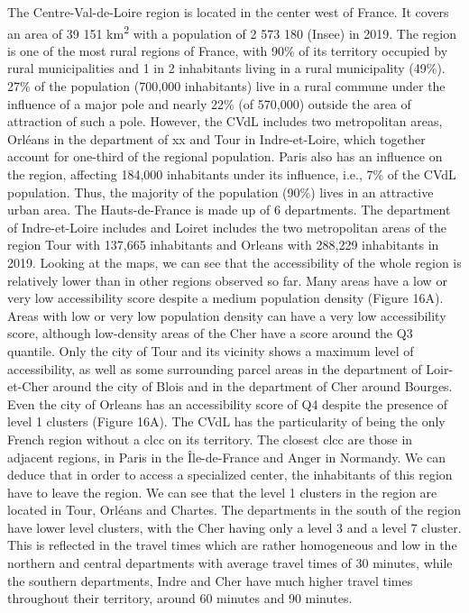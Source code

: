 The Centre-Val-de-Loire region is located in the center west of France. It
covers an area of 39 151 km\textsuperscript{2} with a population of 2 573 180
(Insee) in 2019. The region is one of the most rural regions of France, with
90\% of its territory occupied by rural municipalities and 1 in 2 inhabitants
living in a rural municipality (49\%). 27\% of the population (700,000
inhabitants) live in a rural commune under the influence of a major pole and
nearly 22\% (of 570,000) outside the area of attraction of such a pole. However,
the CVdL includes two metropolitan areas, Orléans in the department of xx and
Tour in Indre-et-Loire, which together account for one-third of the regional
population. Paris also has an influence on the region, affecting 184,000
inhabitants under its influence, i.e., 7\% of the CVdL population. Thus, the
majority of the population (90\%) lives in an attractive urban area. The
Hauts-de-France is made up of 6 departments. The department of Indre-et-Loire
includes and Loiret includes the two metropolitan areas of the region Tour with
137,665 inhabitants and Orleans with 288,229 inhabitants in 2019. Looking at the
maps, we can see that the accessibility of the whole region is relatively lower
than in other regions observed so far. Many areas have a low or very low
accessibility score despite a medium population density (Figure 16A). Areas with
low or very low population density can have a very low accessibility score,
although low-density areas of the Cher have a score around the Q3 quantile. Only
the city of Tour and its vicinity shows a maximum level of accessibility, as
well as some surrounding parcel areas in the department of Loir-et-Cher around
the city of Blois and in the department of Cher around Bourges. Even the city of
Orleans has an accessibility score of Q4 despite the presence of level 1
clusters (Figure 16A). The CVdL has the particularity of being the only French
region without a \ac{clcc} on its territory. The closest \ac{clcc} are those in
adjacent regions, in Paris in the Île-de-France and Anger in Normandy. We can
deduce that in order to access a specialized center, the inhabitants of this
region have to leave the region.  We can see that the level 1 clusters in the
region are located in Tour, Orléans and Chartes. The departments in the south of
the region have lower level clusters, with the Cher having only a level 3 and a
level 7 cluster. This is reflected in the travel times which are rather
homogeneous and low in the northern and central departments with average travel
times of 30 minutes, while the southern departments, Indre and Cher have much
higher travel times throughout their territory, around 60 minutes and 90
minutes.

